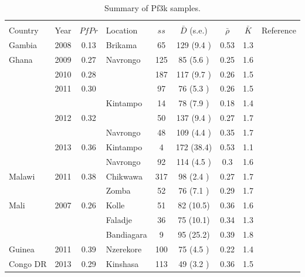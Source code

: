 \documentclass[9pt,lineno]{elife}
\begin{document}
\begin{table}[btp]
  \caption{Summary of Pf3k samples.}\label{tab:Pf3k}
{\small
\begin{tabular}{p{1.4cm} c c |p{1.7cm} c c c c p{2.7cm}}
\toprule
                &                    &      &         &        &                   &              &          &  \\
Country         &   Year   &$PfPr$&Location & $ss$   & $\bar{D}$ (s.e.)  & $\bar{\rho}$ & $\bar{K}$& Reference\\
\midrule
Gambia          &2008           &0.13  &Brikama&65   &129  (9.4 )&0.53 &1.3  & \citet{Amambua-Ngwa2012}\\
\hline
Ghana           &2009           &0.27  &Navrongo&125  &85   (5.6 )&0.25 &1.6  &\multirow{3}{*}{\parbox{3.4cm}{\citet{Duffy2015,Kamau2015,eLife2016}}}\\
                &2010           &0.28  &               &187  &117  (9.7 )&0.26 &1.5  &\\
                &2011           &0.30  &               &97   &76   (5.3 )&0.26 &1.5  &\\
                &               &      &Kintampo&14   &78   (7.9 )&0.18 &1.4  &\\
                &2012           &0.32  &               &50   &137  (9.4 )&0.27 &1.7  &\\
                &               &      &Navrongo&48   &109  (4.4 )&0.35 &1.7  &\\
                &2013           &0.36  &Kintampo&4    &172  (38.4)&0.53 &1.1  &\\
                &               &      &Navrongo&92   &114  (4.5 )&0.3  &1.6  &\\
\hline
Malawi          &2011           &0.38  &Chikwawa&317  &98   (2.4 )&0.27 &1.7  &\citet{Ocholla2014}\\
                &               &      &Zomba&52   &76   (7.1 )&0.29 &1.7  &\\
\hline
Mali            &2007           &0.26  &Kolle&51   &82   (10.5)&0.36 &1.6  &\multirow{3}{*}{\parbox{3.4cm}{\citet{eLife2016}}}\\
                &               &      &Faladje&36   &75   (10.1)&0.34 &1.3  &\\
                &               &      &Bandiagara&9    &95   (25.2)&0.39 &1.8  &\\
\cline{1-8}
Guinea          &2011           &0.39  &Nzerekore&100  &75   (4.5 )&0.22 &1.4  &\\
\cline{1-8}
Congo DR        &2013           &0.29  &Kinshasa&113  &49   (3.2 )&0.36 &1.5  &\\

\end{tabular}}
\end{table}
\end{document}
